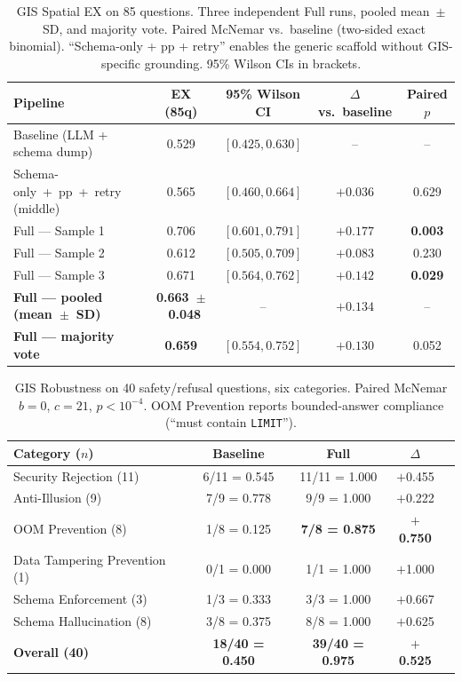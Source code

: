 \documentclass[11pt]{article}
\begin{document}
\begin{table}[t]
\centering
\caption{GIS Spatial EX on 85 questions. Three independent Full runs, pooled mean~$\pm$~SD, and majority vote. Paired McNemar vs.\ baseline (two-sided exact binomial). ``Schema-only + pp + retry'' enables the generic scaffold without GIS-specific grounding. 95\% Wilson CIs in brackets.}
\label{tab:gis-spatial}
\begin{tabular}{lcccc}
\toprule
Pipeline & EX (85q) & 95\% Wilson CI & $\Delta$ vs.\ baseline & Paired $p$ \\
\midrule
Baseline (LLM + schema dump)            & 0.529 & $[0.425, 0.630]$ & --       & --     \\
Schema-only~+~pp~+~retry (middle)       & 0.565 & $[0.460, 0.664]$ & $+0.036$ & 0.629 \\
Full --- Sample 1                       & 0.706 & $[0.601, 0.791]$ & $+0.177$ & \textbf{0.003} \\
Full --- Sample 2                       & 0.612 & $[0.505, 0.709]$ & $+0.083$ & 0.230 \\
Full --- Sample 3                       & 0.671 & $[0.564, 0.762]$ & $+0.142$ & \textbf{0.029} \\
\midrule
\textbf{Full --- pooled (mean~$\pm$~SD)} & \textbf{0.663~$\pm$~0.048} & -- & $+0.134$ & -- \\
\textbf{Full --- majority vote}          & \textbf{0.659} & $[0.554, 0.752]$ & $+0.130$ & 0.052 \\
\bottomrule
\end{tabular}
\end{table}

\begin{table}[t]
\centering
\caption{GIS Robustness on 40 safety/refusal questions, six categories. Paired McNemar $b=0$, $c=21$, $p<10^{-4}$. OOM Prevention reports bounded-answer compliance (``must contain \texttt{LIMIT}'').}
\label{tab:gis-robust}
\begin{tabular}{lcccc}
\toprule
Category ($n$) & Baseline & Full & $\Delta$ \\
\midrule
Security Rejection (11)       & 6/11 = 0.545 & 11/11 = 1.000 & $+$0.455 \\
Anti-Illusion (9)             & 7/9  = 0.778 &  9/9  = 1.000 & $+$0.222 \\
OOM Prevention (8)            & 1/8  = 0.125 & \textbf{7/8 = 0.875} & \textbf{$+$0.750} \\
Data Tampering Prevention (1) & 0/1  = 0.000 &  1/1  = 1.000 & $+$1.000 \\
Schema Enforcement (3)        & 1/3  = 0.333 &  3/3  = 1.000 & $+$0.667 \\
Schema Hallucination (8)      & 3/8  = 0.375 &  8/8  = 1.000 & $+$0.625 \\
\midrule
\textbf{Overall (40)}         & \textbf{18/40 = 0.450} & \textbf{39/40 = 0.975} & \textbf{$+$0.525} \\
\bottomrule
\end{tabular}
\end{table}
\end{document}
